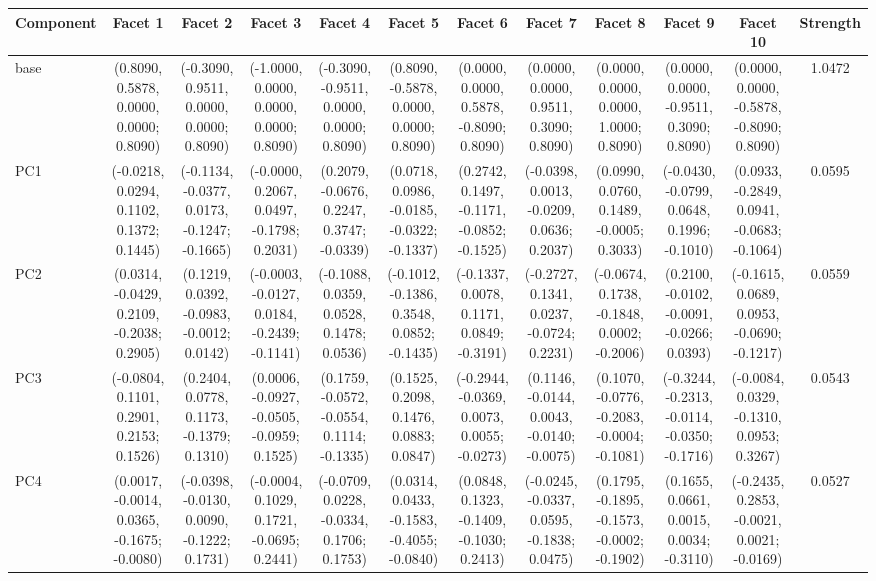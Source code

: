 \begin{table}[p]
\centering
\scriptsize
\setlength{\tabcolsep}{2pt}
\renewcommand{\arraystretch}{1.1}
\begin{tabular}{lccccccccccc}
\toprule
 Component & Facet 1 & Facet 2 & Facet 3 & Facet 4 & Facet 5 & Facet 6 & Facet 7 & Facet 8 & Facet 9 & Facet 10 & Strength \\
\midrule
 base & (0.8090, 0.5878, 0.0000, 0.0000; 0.8090) & (-0.3090, 0.9511, 0.0000, 0.0000; 0.8090) & (-1.0000, 0.0000, 0.0000, 0.0000; 0.8090) & (-0.3090, -0.9511, 0.0000, 0.0000; 0.8090) & (0.8090, -0.5878, 0.0000, 0.0000; 0.8090) & (0.0000, 0.0000, 0.5878, -0.8090; 0.8090) & (0.0000, 0.0000, 0.9511, 0.3090; 0.8090) & (0.0000, 0.0000, 0.0000, 1.0000; 0.8090) & (0.0000, 0.0000, -0.9511, 0.3090; 0.8090) & (0.0000, 0.0000, -0.5878, -0.8090; 0.8090) & 1.0472 \\
 PC1 & (-0.0218, 0.0294, 0.1102, 0.1372; 0.1445) & (-0.1134, -0.0377, 0.0173, -0.1247; -0.1665) & (-0.0000, 0.2067, 0.0497, -0.1798; 0.2031) & (0.2079, -0.0676, 0.2247, 0.3747; -0.0339) & (0.0718, 0.0986, -0.0185, -0.0322; -0.1337) & (0.2742, 0.1497, -0.1171, -0.0852; -0.1525) & (-0.0398, 0.0013, -0.0209, 0.0636; 0.2037) & (0.0990, 0.0760, 0.1489, -0.0005; 0.3033) & (-0.0430, -0.0799, 0.0648, 0.1996; -0.1010) & (0.0933, -0.2849, 0.0941, -0.0683; -0.1064) & 0.0595 \\
 PC2 & (0.0314, -0.0429, 0.2109, -0.2038; 0.2905) & (0.1219, 0.0392, -0.0983, -0.0012; 0.0142) & (-0.0003, -0.0127, 0.0184, -0.2439; -0.1141) & (-0.1088, 0.0359, 0.0528, 0.1478; 0.0536) & (-0.1012, -0.1386, 0.3548, 0.0852; -0.1435) & (-0.1337, 0.0078, 0.1171, 0.0849; -0.3191) & (-0.2727, 0.1341, 0.0237, -0.0724; 0.2231) & (-0.0674, 0.1738, -0.1848, 0.0002; -0.2006) & (0.2100, -0.0102, -0.0091, -0.0266; 0.0393) & (-0.1615, 0.0689, 0.0953, -0.0690; -0.1217) & 0.0559 \\
 PC3 & (-0.0804, 0.1101, 0.2901, 0.2153; 0.1526) & (0.2404, 0.0778, 0.1173, -0.1379; 0.1310) & (0.0006, -0.0927, -0.0505, -0.0959; 0.1525) & (0.1759, -0.0572, -0.0554, 0.1114; -0.1335) & (0.1525, 0.2098, 0.1476, 0.0883; 0.0847) & (-0.2944, -0.0369, 0.0073, 0.0055; -0.0273) & (0.1146, -0.0144, 0.0043, -0.0140; -0.0075) & (0.1070, -0.0776, -0.2083, -0.0004; -0.1081) & (-0.3244, -0.2313, -0.0114, -0.0350; -0.1716) & (-0.0084, 0.0329, -0.1310, 0.0953; 0.3267) & 0.0543 \\
 PC4 & (0.0017, -0.0014, 0.0365, -0.1675; -0.0080) & (-0.0398, -0.0130, 0.0090, -0.1222; 0.1731) & (-0.0004, 0.1029, 0.1721, -0.0695; 0.2441) & (-0.0709, 0.0228, -0.0334, 0.1706; 0.1753) & (0.0314, 0.0433, -0.1583, -0.4055; -0.0840) & (0.0848, 0.1323, -0.1409, -0.1030; 0.2413) & (-0.0245, -0.0337, 0.0595, -0.1838; 0.0475) & (0.1795, -0.1895, -0.1573, -0.0002; -0.1902) & (0.1655, 0.0661, 0.0015, 0.0034; -0.3110) & (-0.2435, 0.2853, -0.0021, 0.0021; -0.0169) & 0.0527 \\

\end{tabular}
\end{table}

